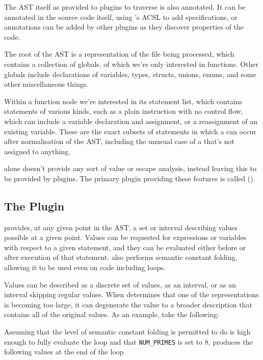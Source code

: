 The AST itself as provided to plugins to traverse is also annotated. It can be annotated in the source code itself, using 's ACSL to add specifications, or annotations can be added by other plugins as they discover properties of the code.

The root of the AST is a representation of the file being processed, which contains a collection of globals, of which we're only interested in functions. Other globals include declarations of variables, types, structs, unions, enums, and some other miscellaneous things.

Within a function node we're interested in its statement list, which contains statements of various kinds, such as a plain instruction with no control flow, which can include a variable declaration and assignment, or a reassignment of an existing variable. These are the exact subsets of statements in which a \malloc{} can occur after normalisation of the AST, including the unusual case of a \malloc{} that's not assigned to anything.

 alone doesn't provide any sort of value or escape analysis, instead leaving this to be provided by plugins. The primary plugin providing these features is called  ().

\subsection{The  Plugin}

 provides, at any given point in the AST, a set or interval describing values possible at a given point. Values can be requested for expressions or variables with respect to a given statement, and they can be evaluated either before or after execution of that statement.  also performs semantic constant folding, allowing it to be used even on code including loops.

Values can be described as a discrete set of values, as an interval, or as an interval skipping regular values. When  determines that one of the representations is becoming too large, it can degenerate the value to a broader description that contains all of the original values. As an example, take the following:



Assuming that the level of semantic constant folding  is permitted to do is high enough to fully evaluate the loop and that \texttt{NUM\_PRIMES} is set to 8,  produces the following values at the end of the loop

